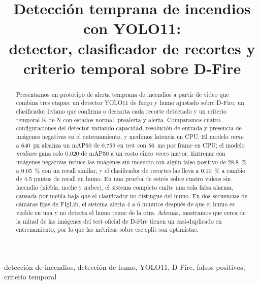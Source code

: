 \documentclass[conference,a4paper]{IEEEtran}
\begin{document}
\title{Detección temprana de incendios con YOLO11:\\
detector, clasificador de recortes y criterio temporal sobre D-Fire}

\author{
}

\maketitle

\begin{abstract}
Presentamos un prototipo de alerta temprana de incendios a partir de video que combina tres etapas: un detector YOLO11 de fuego y humo ajustado sobre D-Fire, un clasificador liviano que confirma o descarta cada recorte detectado y un criterio temporal K-de-N con estados normal, prealerta y alerta. Comparamos cuatro configuraciones del detector variando capacidad, resolución de entrada y presencia de imágenes negativas en el entrenamiento, y medimos latencia en CPU. El modelo \textit{nano} a \SI{640}{px} alcanza un mAP50 de \num{0.759} en test con \SI{56}{ms} por frame en CPU; el modelo \textit{medium} gana solo \num{0.020} de mAP50 a un costo cinco veces mayor. Entrenar con imágenes negativas reduce las imágenes sin incendio con algún falso positivo de \SI{28.8}{\percent} a \SI{0.65}{\percent} con un recall similar, y el clasificador de recortes las lleva a \SI{0.10}{\percent} a cambio de \num{4.5} puntos de recall en humo. En una prueba de estrés sobre cuatro videos sin incendio (niebla, noche y nubes), el sistema completo emite una sola falsa alarma, causada por niebla baja que el clasificador no distingue del humo. En dos secuencias de cámaras fijas de FIgLib, el sistema alerta 4 a 6 minutos después de que el humo es visible en una y no detecta el humo tenue de la otra. Además, mostramos que cerca de la mitad de las imágenes del test oficial de D-Fire tienen un casi-duplicado en entrenamiento, por lo que las métricas sobre ese split son optimistas.
\end{abstract}

\begin{IEEEkeywords}
detección de incendios, detección de humo, YOLO11, D-Fire, falsos positivos, criterio temporal
\end{IEEEkeywords}
\end{document}
